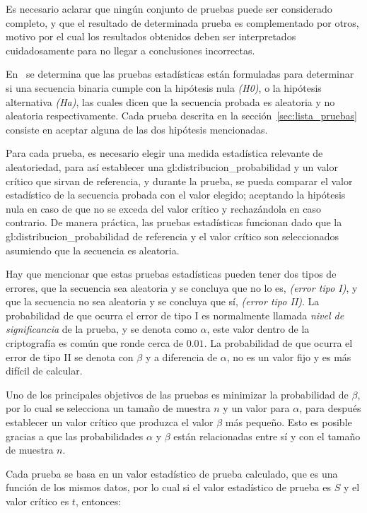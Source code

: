 Es necesario aclarar que ningún conjunto de pruebas puede ser considerado
completo, y que el resultado de determinada prueba es complementado por
otros, motivo por el cual los resultados obtenidos deben ser interpretados
cuidadosamente para no llegar a conclusiones incorrectas.

En~\cite{nist_pruebas} se determina que las pruebas estadísticas están
formuladas para determinar si una secuencia binaria cumple con la hipótesis
nula \textit{(H0)}, o la hipótesis alternativa \textit{(Ha)}, las cuales dicen
que la secuencia probada es aleatoria y no aleatoria respectivamente. Cada
prueba descrita en la sección~\ref{sec:lista_pruebas} consiste en aceptar
alguna de las dos hipótesis mencionadas.

Para cada prueba, es necesario elegir una medida estadística relevante de
aleatoriedad, para así establecer una \gls{gl:distribucion_probabilidad} y un
valor crítico que sirvan de referencia, y durante la prueba, se pueda
comparar el valor estadístico de la secuencia probada con el valor elegido;
aceptando la hipótesis nula en caso de que no se exceda del valor crítico y
rechazándola en caso contrario. De manera práctica, las pruebas estadísticas
funcionan dado que la \gls{gl:distribucion_probabilidad} de referencia y el
valor crítico son seleccionados asumiendo que la secuencia es aleatoria.

Hay que mencionar que estas pruebas estadísticas pueden tener dos tipos de
errores, que la secuencia sea aleatoria y se concluya que no lo es,
\textit{(error tipo I)}, y que la secuencia no sea aleatoria y se concluya
que sí, \textit{(error tipo II)}. La probabilidad de que ocurra el error de
tipo I es normalmente llamada \textit{nivel de significancia} de la prueba, y se
denota como $\alpha$, este valor dentro de la criptografía es común que ronde
cerca de $0.01$. La probabilidad de que ocurra el error de tipo II se denota
con $\beta$ y a diferencia de $\alpha$, no es un valor fijo y es más difícil
de calcular.

Uno de los principales objetivos de las pruebas es minimizar la probabilidad
de $\beta$, por lo cual se selecciona un tamaño de muestra $n$ y un valor para
$\alpha$, para después establecer un valor crítico que produzca el valor
$\beta$ más pequeño. Esto es posible gracias a que las probabilidades $\alpha$
y $\beta$ están relacionadas entre sí y con el tamaño de muestra $n$.

Cada prueba se basa en un valor estadístico de prueba calculado, que es una
función de los mismos datos, por lo cual si el valor estadístico de prueba
es $S$ y el valor crítico es $t$, entonces:

